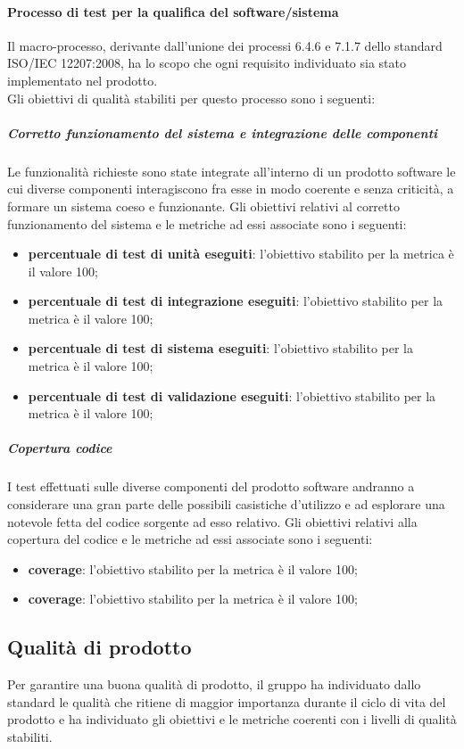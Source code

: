 			\paragraph{Processo di test per la qualifica del software/sistema}
			Il macro-processo, derivante dall'unione dei processi 6.4.6 e 7.1.7 dello standard ISO/IEC 12207:2008, ha lo scopo che ogni requisito individuato sia stato implementato nel prodotto.
			\\Gli obiettivi di qualità stabiliti per questo processo sono i seguenti:
				\subparagraph{Corretto funzionamento del sistema e integrazione delle componenti}
				Le funzionalità richieste sono state integrate all'interno di un prodotto software le cui diverse componenti interagiscono fra esse in modo coerente e senza criticità, a formare un sistema coeso e funzionante.
				Gli obiettivi relativi al corretto funzionamento del sistema e le metriche ad essi associate sono i seguenti:
		 		\begin{itemize}
					\item \textbf{percentuale di test di unità eseguiti}: l'obiettivo stabilito per la metrica è il valore 100;
					\item \textbf{percentuale di test di integrazione eseguiti}: l'obiettivo stabilito per la metrica è il valore 100;
					\item \textbf{percentuale di test di sistema eseguiti}: l'obiettivo stabilito per la metrica è il valore 100;
					\item \textbf{percentuale di test di validazione eseguiti}: l'obiettivo stabilito per la metrica è il valore 100;
				\end{itemize}
				
				\subparagraph{Copertura codice}
				I test effettuati sulle diverse componenti del prodotto software andranno a considerare una gran parte delle possibili casistiche d'utilizzo e ad esplorare una notevole fetta del codice sorgente ad esso relativo. Gli obiettivi relativi alla copertura del codice e le metriche ad essi associate sono i seguenti:
				\begin{itemize}
					\item \textbf{ coverage}: l'obiettivo stabilito per la metrica è il valore 100;
					\item \textbf{ coverage}: l'obiettivo stabilito per la metrica è il valore 100;
				\end{itemize}
	
	\subsection{Qualità di prodotto}
	Per garantire una buona qualità di prodotto, il gruppo \hx{} ha individuato dallo standard  le qualità che ritiene di maggior importanza durante il ciclo di vita del prodotto e ha individuato gli obiettivi e le metriche coerenti con i livelli di qualità stabiliti.
